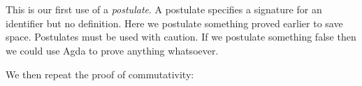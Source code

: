 \begin{fence}
\begin{code}%
\>[0]\<%
\\
\>[0][@{}l@{\AgdaIndent{0}}]%
\>[2]\AgdaSpace{}%
\AgdaSymbol{:}\AgdaSpace{}%
\AgdaSpace{}%
\AgdaSymbol{(}\AgdaSpace{}%
\AgdaSymbol{:}\AgdaSpace{}%
\AgdaSymbol{)}\AgdaSpace{}%
\AgdaSpace{}%
\AgdaSpace{}%
\AgdaOperator{\AgdaFunction{+}}\AgdaSpace{}%
\AgdaSpace{}%
\AgdaSpace{}%
\<%
\\
%
\>[2]\AgdaSpace{}%
\AgdaSymbol{:}\AgdaSpace{}%
\AgdaSpace{}%
\AgdaSymbol{(}\AgdaSpace{}%
\AgdaSpace{}%
\AgdaSymbol{:}\AgdaSpace{}%
\AgdaSymbol{)}\AgdaSpace{}%
\AgdaSpace{}%
\AgdaSpace{}%
\AgdaOperator{\AgdaFunction{+}}\AgdaSpace{}%
\AgdaSpace{}%
\AgdaSpace{}%
\AgdaSpace{}%
\AgdaSpace{}%
\AgdaSymbol{(}\AgdaSpace{}%
\AgdaOperator{\AgdaFunction{+}}\AgdaSpace{}%
\AgdaSymbol{)}\<%
\end{code}
\end{fence}

This is our first use of a \emph{postulate}. A postulate specifies a
signature for an identifier but no definition. Here we postulate
something proved earlier to save space. Postulates must be used with
caution. If we postulate something false then we could use Agda to prove
anything whatsoever.

We then repeat the proof of commutativity:

